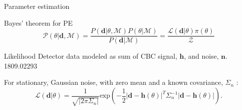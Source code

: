 \documentclass[aspectratio=169, 11pt]{beamer}
\begin{document}
\begin{frame}{Parameter estimation}
     \begin{block}{Bayes' theorem for PE}
    \begin{equation}
       \mathcal{P}(\theta | \textbf{d}, \mathcal{M}) = \frac{P(\textbf{d} | \theta, \mathcal{M}) P(\theta | \mathcal{M})}{P(\textbf{d} | \mathcal{M})} = \frac{\mathcal{L}(\textbf{d} | \theta) \pi(\theta)}{\mathcal{Z}}
    \end{equation}
    \end{block}

    \begin{block}{Likelihood}
    Detector data modeled as sum of CBC signal, $\textbf{h}$, and noise, $\textbf{n}$. {\tiny 1809.02293}

    For stationary, Gaussian noise, with zero mean and a known covariance, $\Sigma_n$ : \\
    \begin{equation}
        \mathcal{L}(\textbf{d} | \theta) = \frac{1}{\sqrt{|2\pi\Sigma_n|}} \textrm{exp}\left(-\frac{1}{2} |\textbf{d} - \textbf{h}(\theta)|^T \Sigma_n^{-1} |\textbf{d} - \textbf{h}(\theta)| \right).
    \end{equation}
    \end{block}
\end{frame}

\end{document}
